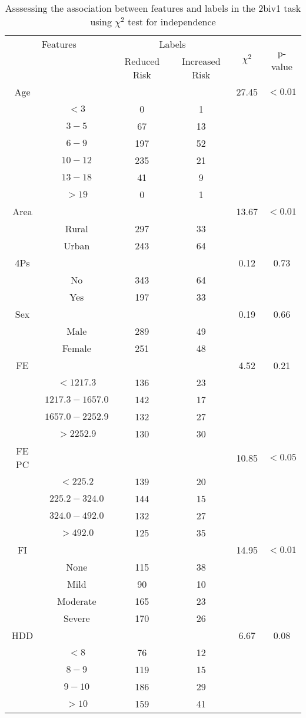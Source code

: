 \begin{table}[!htb]
\centering
\caption{Asssessing the association between features and labels in the 2biv1 task using $\chi^2$ test for independence}
\label{tab:chitest_2biv1}
\begin{tabular}{c c | c c| c | c}
\hline
\multicolumn{2}{c|}{Features}& \multicolumn{2}{c|}{Labels}& \multirow{2}{*}{$\chi^2$} & \multirow{2}{*}{p-value}\\ 
& & Reduced Risk & Increased Risk & & \\ 
\hline
Age &  &  & & 27.45 & $< 0.01$ \\ 
& $< 3$ & 0 & 1& & \\ 
& $3-5$ & 67 & 13& & \\ 
& $6-9$ & 197 & 52& & \\ 
& $10-12$ & 235 & 21& & \\ 
& $13-18$ & 41 & 9& & \\ 
& $> 19$ & 0 & 1& & \\ 
\hline 
Area &  &  & & 13.67 & $< 0.01$ \\ 
& Rural & 297 & 33& & \\ 
& Urban & 243 & 64& & \\ 
\hline 
4Ps &  &  & & 0.12 & 0.73 \\ 
& No & 343 & 64& & \\ 
& Yes & 197 & 33& & \\ 
\hline 
Sex &  &  & & 0.19 & 0.66 \\ 
& Male & 289 & 49& & \\ 
& Female & 251 & 48& & \\ 
\hline 
FE &  &  & & 4.52 & 0.21 \\ 
& $< 1217.3$ & 136 & 23& & \\ 
& $1217.3-1657.0$ & 142 & 17& & \\ 
& $1657.0-2252.9$ & 132 & 27& & \\ 
& $> 2252.9$ & 130 & 30& & \\ 
\hline 
FE PC &  &  & & 10.85 & $< 0.05$ \\ 
& $< 225.2$ & 139 & 20& & \\ 
& $225.2-324.0$ & 144 & 15& & \\ 
& $324.0-492.0$ & 132 & 27& & \\ 
& $> 492.0$ & 125 & 35& & \\ 
\hline 
FI &  &  & & 14.95 & $< 0.01$ \\ 
& None & 115 & 38& & \\ 
& Mild & 90 & 10& & \\ 
& Moderate & 165 & 23& & \\ 
& Severe & 170 & 26& & \\ 
\hline 
HDD &  &  & & 6.67 & 0.08 \\ 
& $< 8$ & 76 & 12& & \\ 
& $8-9$ & 119 & 15& & \\ 
& $9-10$ & 186 & 29& & \\ 
& $> 10$ & 159 & 41& & \\ 
\hline 
\end{tabular}
\end{table}
